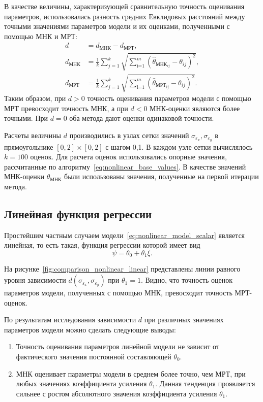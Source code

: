 В качестве величины, характеризующей сравнительную точность оценивания параметров,
использовалась разность средних Евклидовых расстояний
между точными значениями параметров модели и их оценками, полученными
с помощью МНК и МРТ:
\begin{equation}
  \begin{aligned}
    d &= d_{\text{МНК}} - d_{\text{МРТ}}, \\
    d_{\text{МНК}} &=
    \frac{1}{k} \sum_{j=1}^k
    \sqrt{\sum_{\text{i=1}}^m (\hat{\theta}_{\text{МНК}_{ij}} - \theta_{ij})^2}, \\
    d_{\text{МРТ}} &=
    \frac{1}{k} \sum_{j=1}^k
    \sqrt{\sum_{\text{i=1}}^m (\hat{\theta}_{\text{МРТ}_{ij}} - \theta_{ij})^2}.
  \end{aligned}
  \label{eq:dst_nonlinear_param}
\end{equation}
Таким образом, при \( d > 0 \) точность оценивания параметров модели с помощью МРТ
превосходит точность МНК, а при \( d < 0 \) МНК-оценки являются более точными.
При \( d = 0 \) оба метода дают оценки одинаковой точности.

Расчеты величины \( d \) производились в узлах сетки значений
\( \sigma_{\varepsilon_x}, \sigma_{\varepsilon_y} \) в прямоугольнике
\( [0, 2] \times [0, 2] \) с шагом 0{,}1.
В каждом узле сетки вычислялось \( k = 100 \) оценок.
Для расчета оценок использовались опорные значения,
рассчитанные по алгоритму~\eqref{eq:nonlinear_base_values}.
В качестве значений МНК-оценки \( \theta_{\text{МНК}} \)
были использованы значения, полученные на первой итерации метода.

\pagebreak
\subsection{Линейная функция регрессии}

Простейшим частным случаем модели~\eqref{eq:nonlinear_model_scalar} является линейная,
то есть такая, функция регрессии которой имеет вид
\[ \psi = \theta_0 + \theta_1 \xi. \]

На рисунке~\ref{fig:comparison_nonlinear_linear}
представлены линии равного уровня зависимости \( d(\sigma_{\varepsilon_x}, \sigma_{\varepsilon_y}) \)
при \( \theta_1 = 1 \).
Видно, что точность оценок параметров модели, полученных с помощью МНК,
превосходит точность МРТ-оценок.

По результатам исследования зависимости \( d \) при различных значениях
параметров модели можно сделать следующие выводы:
\begin{enumerate}
\item Точность оценивания параметров линейной модели не зависит
  от фактического значения постоянной составляющей \( \theta_0 \).
\item МНК оценивает параметры модели в среднем более точно, чем МРТ,
  при любых значениях коэффициента усиления \( \theta_1 \).
  Данная тенденция проявляется сильнее с ростом абсолютного значения
  коэффициента усиления \( \theta_1 \).
\end{enumerate}

